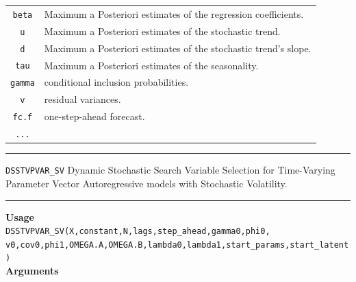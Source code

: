 \documentclass[
  12pt,
]{book}
\theoremstyle{break}
\theoremstyle{nonumberplain}
\begin{document}
\begin{small}
\begin{longtable}{ c l }
\texttt{beta} & Maximum a Posteriori estimates of the regression coefficients. \\
\texttt{u} & Maximum a Posteriori estimates of the stochastic trend. \\
\texttt{d} & Maximum a Posteriori estimates of the stochastic trend's slope. \\
\texttt{tau} & Maximum a Posteriori estimates of the seasonality. \\
\texttt{gamma} &  conditional inclusion probabilities.\\
\texttt{v} &  residual variances.\\
\texttt{fc.f} & one-step-ahead forecast.\\
\texttt{...} &
\end{longtable}
\end{small}
\hrule
\vspace{0.5em}

\texttt{DSSTVPVAR\_SV} Dynamic Stochastic Search Variable Selection for
Time-Varying Parameter Vector Autoregressive models with Stochastic
Volatility. \vspace{1em}

\hrule
\vspace{1em}

\textbf{Usage}\\
\texttt{DSSTVPVAR\_SV(X,constant,N,lags,step\_ahead,gamma0,phi0,\\
v0,cov0,phi1,OMEGA.A,OMEGA.B,lambda0,lambda1,start\_params,start\_latent)}\\
\textbf{Arguments}
\end{document}
